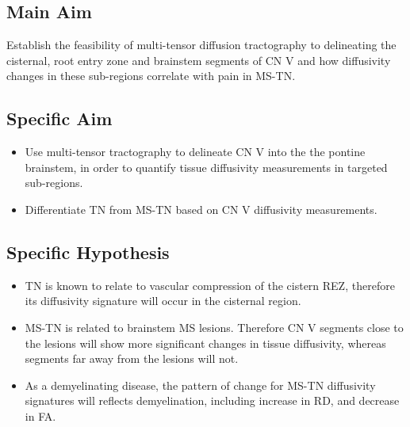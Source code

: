 \subsection{Main Aim} 
Establish the feasibility of multi-tensor diffusion tractography to delineating the cisternal, root entry zone and brainstem segments of CN V and how diffusivity changes in these sub-regions correlate with pain in MS-TN.

\subsection{Specific Aim}
\begin{itemize}
    \item Use multi-tensor tractography to delineate CN V into the the pontine brainstem, in order to quantify tissue diffusivity measurements in targeted sub-regions.
    \item Differentiate TN from MS-TN based on CN V diffusivity measurements.
\end{itemize}

\subsection{Specific Hypothesis}
\begin{itemize}
    \item TN is known to relate to vascular compression of the cistern REZ, therefore its diffusivity signature will occur in the cisternal region.
    \item MS-TN is related to brainstem MS lesions. Therefore CN V segments close to the lesions will show more significant changes in tissue diffusivity, whereas segments far away from the lesions will not. 
    \item As a demyelinating disease, the pattern of change for MS-TN diffusivity signatures will reflects demyelination, including increase in RD, and decrease in FA. 
\end{itemize}

